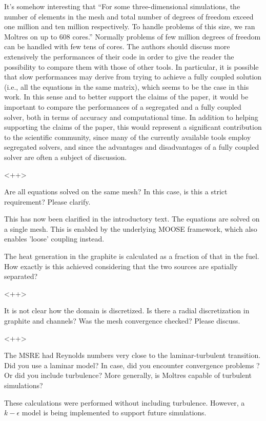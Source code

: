 \documentclass[answers,11pt]{exam}
\begin{document}
\begin{questions}
\question It's somehow interesting that ``For some three-dimensional 
simulations, the number of elements in the mesh and total number of degrees of 
freedom exceed one million and ten million respectively. To handle problems of 
this size, we ran Moltres on up to 608 cores.'' Normally problems of few million degrees of freedom can be handled with few tens of cores. The authors should discuss more extensively the performances of their code in order to give the reader the possibility to compare them with those of other tools. In particular, it is possible that slow performances may derive from trying to achieve a fully coupled solution (i.e., all the equations in the same matrix), which seems to be the case in this work. In this sense and to better support the claims of the paper, it would be important to compare the performances of a segregated and a fully coupled  solver, both in terms of accuracy and computational time. In addition to helping supporting the claims of the paper, this
would represent a significant contribution to the scientific community, since many of the currently available tools employ segregated solvers, and since the advantages and disadvantages of a fully coupled solver are often a subject of discussion.
\begin{solution}
        <++>
\end{solution}


\question Are all equations solved on the same mesh? In this case, is this a strict requirement? Please clarify.
\begin{solution}
        This has now been clarified in the introductory text. The equations are 
        solved on a single mesh. This is enabled by the underlying MOOSE 
        framework, which also enables 'loose' coupling instead.
\end{solution}

\question The heat generation in the graphite is calculated as a fraction of that in the fuel. How exactly is this achieved considering that the two sources are spatially separated?
\begin{solution}
        <++>
\end{solution}

\question It is not clear how the domain is discretized. Is there a radial discretization in graphite and channels? Was the mesh convergence checked? Please discuss.
\begin{solution}
       <++>
\end{solution}

\question The MSRE had Reynolds numbers very close to the laminar-turbulent transition. Did you use a laminar model? In case, did you encounter convergence problems ?
Or did you include turbulence? More generally, is Moltres capable of turbulent simulations?
\begin{solution}
        These calculations were performed without including turbulence. However, a $k-\epsilon$ model is being implemented to support future simulations.
\end{solution}


\end{questions}
\end{document}
